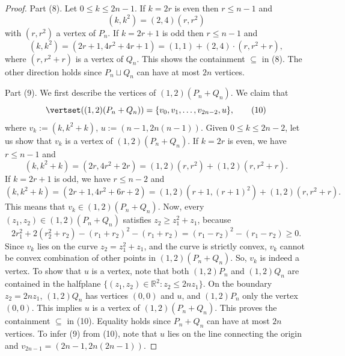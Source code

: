 \begin{proof}
Part (8). Let $0\le k\le2n-1$. If $k=2r$ is even then $r\le n-1$ and
\[(k,k^2)=(2,4)(r,r^2)\]
with $(r,r^2)$ a vertex of $P_n$. If $k=2r+1$ is odd then $r\le n-1$ and
\[(k,k^2)=(2r+1,4r^2+4r+1)=(1,1)+(2,4)\cdot(r,r^2+r),\]
where $(r,r^2+r)$ is a vertex of $Q_n$. This shows the containment $\subseteq$ in (8). The other direction holds since $P_n\sqcup Q_n$ can have at most $2n$ vertices.

Part (9). We first describe the vertices of $(1,2)(P_n+Q_n)$. We claim that
\begin{equation}
\vertset((1,2)(P_n+Q_n))=\{v_0,v_1,\ldots,v_{2n-2},u\},\tag{10}
\end{equation}
where $v_k:=(k,k^2+k)$, $u:=(n-1,2n(n-1))$.
Given $0\le k\le2n-2$, let us show that $v_k$ is a vertex of $(1,2)(P_n+Q_n)$. If $k=2r$ is even, we have $r\le n-1$ and
\[(k,k^2+k)=(2r,4r^2+2r)=(1,2)(r,r^2)+(1,2)(r,r^2+r).\]
If $k=2r+1$ is odd, we have $r\le n-2$ and
\[(k,k^2+k)=(2r+1,4r^2+6r+2)=(1,2)(r+1,(r+1)^2)+(1,2)(r,r^2+r).\]
This means that $v_k\in(1,2)(P_n+Q_n)$. Now, every $(z_1,z_2)\in(1,2)(P_n+Q_n)$ satisfies $z_2\ge z_1^2+z_1$, because
\[2r_1^2+2(r_2^2+r_2)-(r_1+r_2)^2-(r_1+r_2)=(r_1-r_2)^2-(r_1-r_2)\ge0.\]
Since $v_k$ lies on the curve $z_2=z_1^2+z_1$, and the curve is strictly convex, $v_k$ cannot be convex combination of other points in $(1,2)(P_n+Q_n)$. So, $v_k$ is indeed a vertex. To show that $u$ is a vertex, note that both $(1,2)P_n$ and $(1,2)Q_n$ are contained in the halfplane $\{(z_1,z_2)\in\mathbb R^2:z_2\le2nz_1\}$. On the boundary $z_2=2nz_1$, $(1,2)Q_n$ has vertices $(0,0)$ and $u$, and $(1,2)P_n$ only the vertex $(0,0)$. This implies $u$ is a vertex of $(1,2)(P_n+Q_n)$. This proves the containment $\subseteq$ in (10). Equality holds since $P_n+Q_n$ can have at most $2n$ vertices.
To infer (9) from (10), note that $u$ lies on the line connecting the origin and $v_{2n-1}=(2n-1,2n(2n-1))$.
\end{proof}
